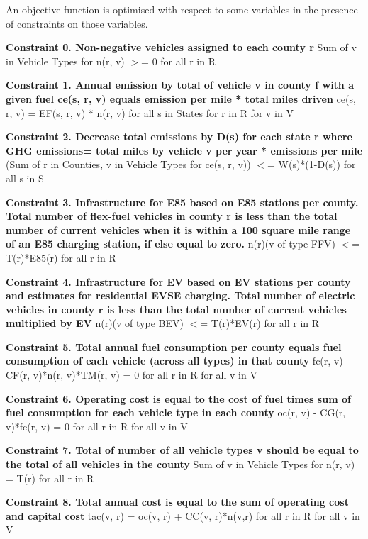\documentclass[answers]{exam}
\begin{document}
\begin{outline}
\1 An objective function is optimised with respect to some variables in the presence of constraints on those variables.

\2 \textbf{Constraint 0. Non-negative vehicles assigned to each county r}
\3 Sum of v in Vehicle Types for n(r, v) $>$= 0 for all r in R

\2 \textbf{Constraint 1. Annual emission by total of vehicle v in county f with a given fuel ce(s, r, v) equals emission per mile * total miles driven}
\3 ce(s, r, v) = EF(s, r, v) * n(r, v) for all s in States for r in R for v in V

\2 \textbf{Constraint 2. Decrease total emissions by D(s) for each state r where GHG emissions= total miles by vehicle v per year * emissions per mile}
\3 (Sum of r in Counties, v in Vehicle Types for ce(s, r, v)) $<$= W(s)*(1-D(s)) for all s in S

\2 \textbf{Constraint 3. Infrastructure for E85 based on E85 stations per county. Total number of flex-fuel vehicles in county r is less than the total number of current vehicles when it is within a 100 square mile range of an E85 charging station, if else equal to zero.}
\3 n(r)(v of type FFV) $<$= T(r)*E85(r) for all r in R

\2 \textbf{Constraint 4. Infrastructure for EV based on EV stations per county and estimates for residential EVSE charging. Total number of electric vehicles in county r is less than the total number of current vehicles multiplied by EV}
\3 n(r)(v of type BEV) $<$= T(r)*EV(r) for all r in R

\2 \textbf{Constraint 5. Total annual fuel consumption per county equals fuel consumption of each vehicle (across all types) in that county}
\3 fc(r, v) - CF(r, v)*n(r, v)*TM(r, v) = 0 for all r in R for all v in V

\2 \textbf{Constraint 6. Operating cost is equal to the cost of fuel times sum of fuel consumption for each vehicle type in each county}
\3 oc(r, v) - CG(r, v)*fc(r, v) = 0 for all r in R for all v in V

\2 \textbf{Constraint 7. Total of number of all vehicle types v should be equal to the total of all vehicles in the county }
\3 Sum of v in Vehicle Types for n(r, v) = T(r) for all r in R

\2 \textbf{Constraint 8. Total annual cost is equal to the sum of operating cost and capital cost}
\3 tac(v, r) = oc(v, r) + CC(v, r)*n(v,r) for all r in R for all v in V

\end{outline}
\end{document}

